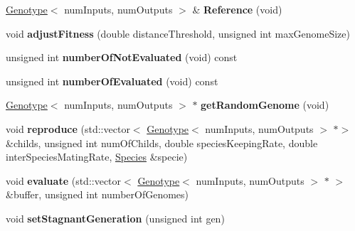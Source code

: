 \begin{DoxyCompactItemize}
\hyperlink{class_indie_neat_1_1_genotype}{Genotype}$<$ num\+Inputs, num\+Outputs $>$ \& {\bfseries Reference} (void)
\item 
\mbox{\label{class_indie_neat_1_1_population_1_1_species_a51a1a704e3ba31f6b58cbc0e042c404a}} 
void {\bfseries adjust\+Fitness} (double distance\+Threshold, unsigned int max\+Genome\+Size)
\item 
\mbox{\label{class_indie_neat_1_1_population_1_1_species_a4569503da7966e73bcefaf19b08ca1b9}} 
unsigned int {\bfseries number\+Of\+Not\+Evaluated} (void) const
\item 
\mbox{\label{class_indie_neat_1_1_population_1_1_species_a7deb0c402c6876ed15e3c8d07d7a458c}} 
unsigned int {\bfseries number\+Of\+Evaluated} (void) const
\item 
\mbox{\label{class_indie_neat_1_1_population_1_1_species_a24ef0cd279f380c2d7cf74cd5fdb4622}} 
\hyperlink{class_indie_neat_1_1_genotype}{Genotype}$<$ num\+Inputs, num\+Outputs $>$ $\ast$ {\bfseries get\+Random\+Genome} (void)
\item 
\mbox{\label{class_indie_neat_1_1_population_1_1_species_abd867d0cff4a1f6fd8c2c5dd93cfce0d}} 
void {\bfseries reproduce} (std\+::vector$<$ \hyperlink{class_indie_neat_1_1_genotype}{Genotype}$<$ num\+Inputs, num\+Outputs $>$ $\ast$$>$ \&childs, unsigned int num\+Of\+Childs, double species\+Keeping\+Rate, double inter\+Species\+Mating\+Rate, \hyperlink{class_indie_neat_1_1_population_1_1_species}{Species} \&specie)
\item 
\mbox{\label{class_indie_neat_1_1_population_1_1_species_a58d4063013f4370ee63d18e331aa8a95}} 
void {\bfseries evaluate} (std\+::vector$<$ \hyperlink{class_indie_neat_1_1_genotype}{Genotype}$<$ num\+Inputs, num\+Outputs $>$ $\ast$ $>$ \&buffer, unsigned int number\+Of\+Genomes)
\item 
\mbox{\label{class_indie_neat_1_1_population_1_1_species_a5119a841f2653f5260d49012a0e25455}} 
void {\bfseries set\+Stagnant\+Generation} (unsigned int gen)
$$
\end{DoxyCompactItemize}
